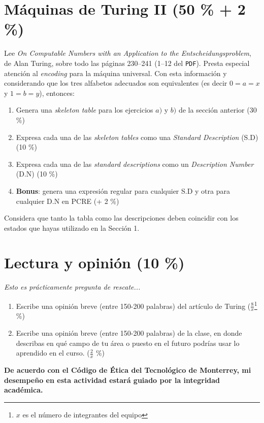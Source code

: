 \documentclass[8pt, onside]{article}
\begin{document}
\section{Máquinas de Turing II (50 \% + 2 \%)}

Lee \textit{On Computable Numbers with an Application to the Entscheidungsproblem}, de Alan Turing, sobre todo las páginas 230--241 (1--12 del \texttt{PDF}). Presta especial atención al \textit{encoding} para la máquina universal. Con esta información y considerando que los tres alfabetos adecuados son equivalentes (es decir $0=a=x$ y $1=b=y$), entonces:

\begin{enumerate}[label=\tt \alph*)]
    \item Genera una \textit{skeleton table} para los ejercicios $a)$ y $b)$ de la sección anterior (30 \%)
    \item Expresa cada una de las \textit{skeleton tables} como una \textit{Standard Description} (S.D) (10 \%)
    \item Expresa cada una de las \textit{standard descriptions} como un \textit{Description Number} (D.N) (10 \%)
    \item \textbf{Bonus}: genera una expresión regular para cualquier S.D y otra para cualquier D.N en PCRE (+ 2 \%)
\end{enumerate}

Considera que tanto la tabla como las descripciones deben coincidir con los estados que hayas utilizado en la Sección 1.

\section{Lectura y opinión (10 \%)}

{\footnotesize \it Esto es prácticamente pregunta de rescate...}

\begin{enumerate}[label=\tt \alph*)]
    \item Escribe una opinión breve (entre 150-200 palabras) del artículo de Turing ($\frac{8}{x}$\footnote{$x$ es el número de integrantes del equipo} \%)
    \item Escribe una opinión breve (entre 150-200 palabras) de la clase, en donde describas en qué campo de tu área o puesto en el futuro podrías usar lo aprendido en el curso. ($\frac{2}{x}$ \%)
\end{enumerate}

\vfill

\textbf{De acuerdo con el Código de Ética del Tecnológico de Monterrey, mi desempeño en esta actividad estará guiado por la integridad académica.}
\end{document}
